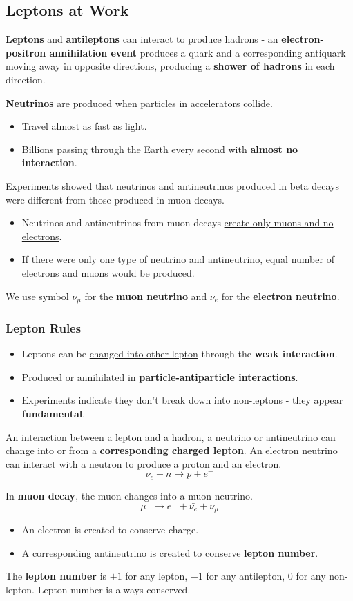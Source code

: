 \subsection{Leptons at Work}

\textbf{Leptons} and \textbf{antileptons} can interact to produce hadrons - an \textbf{electron-positron annihilation event} produces a quark and a corresponding antiquark moving away in opposite directions, producing a \textbf{shower of hadrons} in each direction.

\textbf{Neutrinos} are produced when particles in accelerators collide.
\begin{itemize}
    \item Travel almost as fast as light.
    \item Billions passing through the Earth every second with \textbf{almost no interaction}.
\end{itemize}

Experiments showed that neutrinos and antineutrinos produced in beta decays were different from those produced in muon decays.
\begin{itemize}
    \item Neutrinos and antineutrinos from muon decays \underline{create only muons and no electrons}.
    \item If there were only one type of neutrino and antineutrino, equal number of electrons and muons would be produced.
\end{itemize}
We use symbol $\nu_\mu$ for the \textbf{muon neutrino} and $\nu_e$ for the \textbf{electron neutrino}.

\subsubsection*{Lepton Rules}

\begin{itemize}
    \item Leptons can be \underline{changed into other lepton} through the \textbf{weak interaction}.
    \item Produced or annihilated in \textbf{particle-antiparticle interactions}.
    \item Experiments indicate they don't break down into non-leptons - they appear \textbf{fundamental}.
\end{itemize}

An interaction between a lepton and a hadron, a neutrino or antineutrino can change into or from a \textbf{corresponding charged lepton}. An electron neutrino can interact with a neutron to produce a proton and an electron.
$$\nu_e+n\to p+e^-$$

In \textbf{muon decay}, the muon changes into a muon neutrino.
$$\mu^-\to e^-+\bar{\nu_e}+\nu_\mu$$
\begin{itemize}
    \item An electron is created to conserve charge.
    \item A corresponding antineutrino is created to conserve \textbf{lepton number}.
\end{itemize}

The \textbf{lepton number} is $+1$ for any lepton, $-1$ for any antilepton, 0 for any non-lepton. Lepton number is always conserved.
